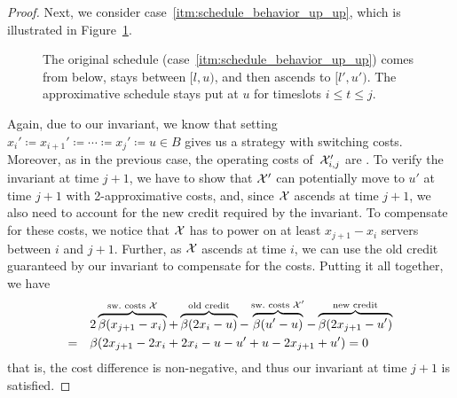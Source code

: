 \begin{proof}
Next, we consider case~\ref{itm:schedule_behavior_up_up}, which is illustrated in Figure~\ref{fig:schedule_behavior_up_up}.
\begin{figure}[ht]
\centering
	
\caption{The original schedule (case~\ref{itm:schedule_behavior_up_up}) comes from below, stays between $[l,u)$, and then ascends to $[l',u')$. The approximative schedule stays put at $u$ for timeslots $i\le t\le j$.}
\label{fig:schedule_behavior_up_up}
\end{figure}
Again, due to our invariant, we know that setting $x_i'\coloneqq x_{i+1}'\coloneqq\dotsb\coloneqq x_j'\coloneqq u\in B$ gives us a strategy with  switching costs. Moreover, as in the previous case, the operating costs of~$\mathcal{X}_{i,j}'$ are . To verify the invariant at time $j+1$, we have to show that $\mathcal{X}'$ can potentially move to $u'$ at time $j+1$ with 2-approximative costs, and, since $\mathcal{X}$ ascends at time $j+1$, we also need to account for the new credit required by the invariant. To compensate for these costs, we notice that $\mathcal{X}$ has to power on at least $x_{j+1}-x_i$ servers between $i$ and $j+1$. Further, as $\mathcal{X}$ ascends at time $i$, we can use the old credit guaranteed by our invariant to compensate for the costs. Putting it all together, we have
\begin{align*}
	&2\overbrace{\beta(x_{j+1}-x_i)}^{\text{sw.\ costs }\mathcal{X}}+\overbrace{\beta(2x_i-u)}^{\text{old credit}}-\overbrace{\beta(u'-u)}^{\text{sw.\ costs }\mathcal{X}'}-\overbrace{\beta(2x_{j+1}-u')}^{\text{new credit}}\\
	=\quad&\beta(2x_{j+1}-2x_i+2x_i-u-u'+u-2x_{j+1}+u')=0
\end{align*}
that is, the cost difference is non-negative, and thus our invariant at time $j+1$ is satisfied.
	

\end{proof}
